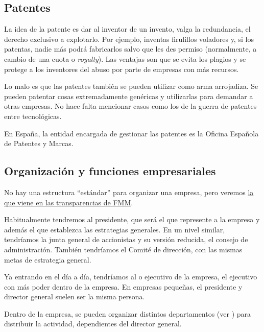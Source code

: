 \documentclass[nochap,palatino,notitlepage]{apuntes}
\begin{document}
\subsection{Patentes}

La idea de la patente es dar al inventor de un invento, valga la redundancia, el derecho exclusivo a explotarlo. Por ejemplo, inventas firulillos voladores y, si los patentas, nadie más podrá fabricarlos salvo que les des permiso (normalmente, a cambio de una cuota o \textit{royalty}). Las ventajas son que se evita los plagios y se protege a los inventores del abuso por parte de empresas con más recursos.

Lo malo es que las patentes también se pueden utilizar como arma arrojadiza. Se pueden patentar cosas extremadamente genéricas y utilizarlas para demandar a otras empresas. No hace falta mencionar casos como los de la guerra de patentes entre tecnológicas.

En España, la entidad encargada de gestionar las patentes es la Oficina Española de Patentes y Marcas.

\subsection{Organización y funciones empresariales}

No hay una estructura ``estándar'' para organizar una empresa, pero veremos \href{http://maestremiranda.com/techdir/organizacion/}{la que viene en las transparencias de FMM}.

Habitualmente tendremos al presidente, que será el que represente a la empresa y además el que establezca las estrategias generales. En un nivel similar, tendríamos la junta general de accionistas y su versión reducida, el consejo de administración. También tendríamos el Comité de dirección, con las mismas metas de estrategia general.

Ya entrando en el día a día, tendríamos al  o ejecutivo de la empresa, el ejecutivo con más poder dentro de la empresa. En empresas pequeñas, el presidente y director general suelen ser la misma persona.

Dentro de la empresa, se pueden organizar distintos departamentos (ver ) para distribuir la actividad, dependientes del director general.
\end{document}
